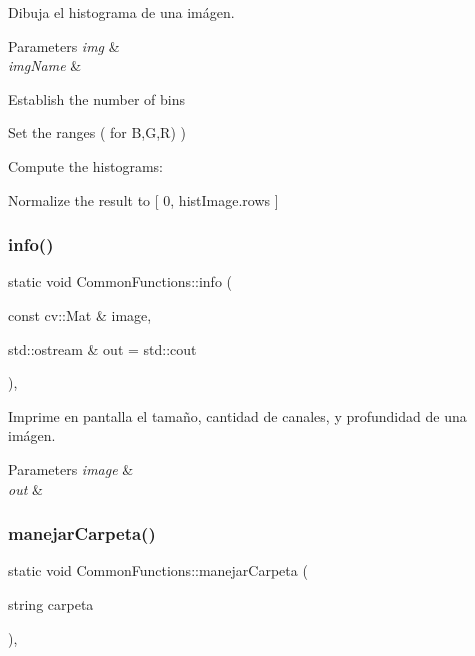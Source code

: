 Dibuja el histograma de una imágen. 


\begin{DoxyParams}{Parameters}
{\em img} & \\
\hline
{\em img\+Name} & \\
\hline
\end{DoxyParams}
Establish the number of bins

Set the ranges ( for B,G,R) )

Compute the histograms\+:

Normalize the result to \mbox{[} 0, hist\+Image.\+rows \mbox{]} \mbox{\label{classCommonFunctions_a51a3e18bdcc2c918ebc81f0cc1f47851}} 
\subsubsection{\texorpdfstring{info()}{info()}}
{\footnotesize\ttfamily static void Common\+Functions\+::info (\begin{DoxyParamCaption}\item[{const cv\+::\+Mat \&}]{image,  }\item[{std\+::ostream \&}]{out = {\ttfamily std\+:\+:cout} }\end{DoxyParamCaption})\hspace{0.3cm}{\ttfamily [inline]}, {\ttfamily [static]}}



Imprime en pantalla el tamaño, cantidad de canales, y profundidad de una imágen. 


\begin{DoxyParams}{Parameters}
{\em image} & \\
\hline
{\em out} & \\
\hline
\end{DoxyParams}
\mbox{\label{classCommonFunctions_a8f31532bc3dd60e5c95d40daaef7c705}} 
\subsubsection{\texorpdfstring{manejar\+Carpeta()}{manejarCarpeta()}}
{\footnotesize\ttfamily static void Common\+Functions\+::manejar\+Carpeta (\begin{DoxyParamCaption}\item[{string}]{carpeta }\end{DoxyParamCaption})\hspace{0.3cm}{\ttfamily [inline]}, {\ttfamily [static]}}



